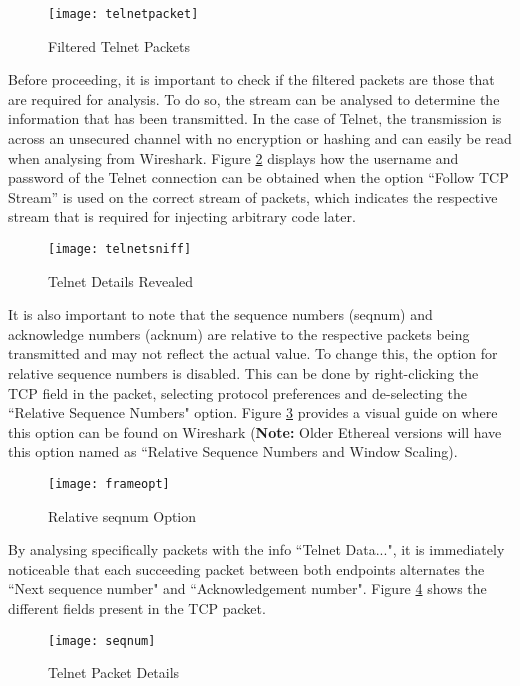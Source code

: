 \documentclass[a4paper,12pt]{article}
\begin{document}
\begin{figure}[H]
	\centering
	\texttt{[image: telnetpacket]}
	\caption{Filtered Telnet Packets}
	\label{fig:telnetpacket}
\end{figure}
\begin{par}
	\noindent Before proceeding, it is important to check if the filtered packets are those that are required for analysis. To do so, the stream can be analysed to determine the information that has been transmitted. In the case of Telnet, the transmission is across an unsecured channel with no encryption or hashing and can easily be read when analysing from Wireshark. Figure \ref{fig:telnetsniff} displays how the username and password of the Telnet connection can be obtained when the option ``Follow TCP Stream'' is used on the correct stream of packets, which indicates the respective stream that is required for injecting arbitrary code later.
\end{par}

\begin{figure}[H]
	\centering
	\texttt{[image: telnetsniff]}
	\caption{Telnet Details Revealed}
	\label{fig:telnetsniff}
\end{figure}


	\begin{par}
	\noindent It is also important to note that the sequence numbers (seqnum) and acknowledge numbers (acknum) are relative to the respective packets being transmitted and may not reflect the actual value. To change this, the option for relative sequence numbers is disabled. This can be done by right-clicking the TCP field in the packet, selecting protocol preferences and de-selecting the ``Relative Sequence Numbers" option. Figure \ref{fig:frameopt} provides a visual guide on where this option can be found on Wireshark (\textbf{Note:} Older Ethereal versions will have this option named as ``Relative Sequence Numbers and Window Scaling).\end{par}

\begin{figure}[H]
	\centering
	\texttt{[image: frameopt]}
	\caption{Relative seqnum Option}
	\label{fig:frameopt}
\end{figure}
\begin{par}
	\noindent By analysing specifically packets with the info ``Telnet Data...", it is immediately noticeable that each succeeding packet between both endpoints alternates the ``Next sequence number" and ``Acknowledgement number". Figure \ref{fig:seqnum} shows the different fields present in the TCP packet.
	\end{par}
\begin{figure}[H]
	\centering
	\texttt{[image: seqnum]}
	\caption{Telnet Packet Details}
	\label{fig:seqnum}
\end{figure}
\end{document}
